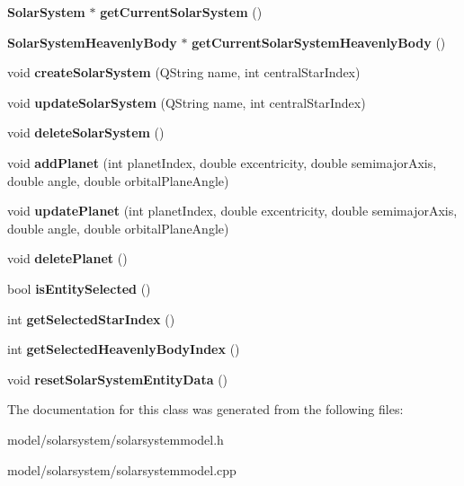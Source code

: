 \begin{DoxyCompactItemize}
\item 
{\bf \-Solar\-System} $\ast$ {\bfseries get\-Current\-Solar\-System} ()\label{db/da1/classSolarSystemModel_aae7435783e5bd0af7e155682fe21d5d6}

\item 
{\bf \-Solar\-System\-Heavenly\-Body} $\ast$ {\bfseries get\-Current\-Solar\-System\-Heavenly\-Body} ()\label{db/da1/classSolarSystemModel_a13e9309b14644c5cff10ff6c893b5b79}

\item 
void {\bfseries create\-Solar\-System} (\-Q\-String name, int central\-Star\-Index)\label{db/da1/classSolarSystemModel_a2cef5b7b9cfd7880f2206c28fcae3b2b}

\item 
void {\bfseries update\-Solar\-System} (\-Q\-String name, int central\-Star\-Index)\label{db/da1/classSolarSystemModel_a4346c62aa3069d683c4d7b5c9c84a199}

\item 
void {\bfseries delete\-Solar\-System} ()\label{db/da1/classSolarSystemModel_ac4f8e24ab92b93a1808af5a68c86e00f}

\item 
void {\bfseries add\-Planet} (int planet\-Index, double excentricity, double semimajor\-Axis, double angle, double orbital\-Plane\-Angle)\label{db/da1/classSolarSystemModel_a39f15260f4624aed3cde0fa4c4f20f5d}

\item 
void {\bfseries update\-Planet} (int planet\-Index, double excentricity, double semimajor\-Axis, double angle, double orbital\-Plane\-Angle)\label{db/da1/classSolarSystemModel_a7a1021e9dc6b7f5e6dd256689f754f5b}

\item 
void {\bfseries delete\-Planet} ()\label{db/da1/classSolarSystemModel_ac148261799e9bfe0cba02d37a75994ca}

\item 
bool {\bfseries is\-Entity\-Selected} ()\label{db/da1/classSolarSystemModel_a8c741144d8dd3192cc08658904c391bc}

\item 
int {\bfseries get\-Selected\-Star\-Index} ()\label{db/da1/classSolarSystemModel_aef22645e984bc8e99e766c7292d77dd4}

\item 
int {\bfseries get\-Selected\-Heavenly\-Body\-Index} ()\label{db/da1/classSolarSystemModel_a107488a16a2d4ba18c8a275473b3d019}

\item 
void {\bfseries reset\-Solar\-System\-Entity\-Data} ()\label{db/da1/classSolarSystemModel_ac3941be4c6e16cc54501c3ced226e31f}

\end{DoxyCompactItemize}


\-The documentation for this class was generated from the following files\-:\begin{DoxyCompactItemize}
\item 
model/solarsystem/solarsystemmodel.\-h\item 
model/solarsystem/solarsystemmodel.\-cpp\end{DoxyCompactItemize}

